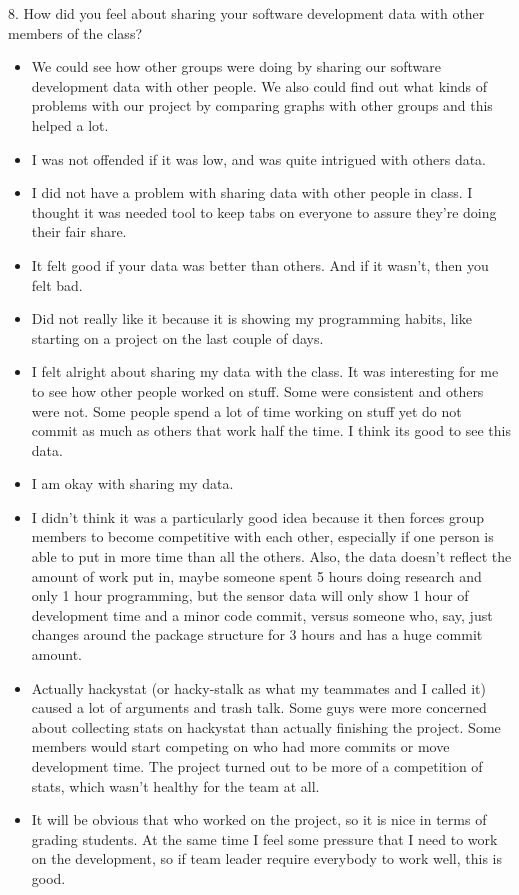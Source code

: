 \documentclass[11pt]{article}
\begin{document}
8. How did you feel about sharing your software development 
data with other members of the class? 
\begin{itemize}
\item We could see how other groups were doing by sharing our software development data with other people. We also could find out what kinds of problems with our project by comparing graphs with other groups and this helped a lot. 
\item I was not offended if it was low, and was quite intrigued with others data.  
\item I did not have a problem with sharing data with other people in class.  I thought it was needed tool to keep tabs on everyone to assure they're doing their fair share.
\item It felt good if your data was better than others.  And if it wasn't, then you felt bad.
\item Did not really like it because it is showing my programming habits, like starting on a project on the last couple of days.
\item I felt alright about sharing my data with the class. It was interesting for me to see how other people worked on stuff. Some were consistent and others were not. Some people spend a lot of time working on stuff yet do not commit as much as others that work half the time. I think its good to see this data.
\item I am okay with sharing my data.  
\item I didn't think it was a particularly good idea because it then forces group members to become competitive with each other, especially if one person is able to put in more time than all the others. Also, the data doesn't reflect the amount of work put in, maybe someone spent 5 hours doing research and only 1 hour programming, but the sensor data will only show 1 hour of development time and a minor code commit, versus someone who, say, just changes around the package structure for 3 hours and has a huge commit amount.
\item Actually hackystat (or hacky-stalk as what my teammates and I called it) caused a lot of arguments and trash talk.  Some guys were more concerned about collecting stats on hackystat than actually finishing the project.  Some members would start competing on who had more commits or move development time.  The project turned out to be more of a competition of stats, which wasn't healthy for the team at all.
\item It will be obvious that who worked on the project, so it is nice in terms of grading students. At the same time I feel some pressure that I need to work on the development, so if team leader require everybody to work well, this is good.

\end{itemize}
\end{document}

